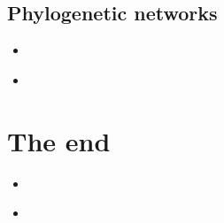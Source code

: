 \documentclass[compress, ucs, xelatex, 11pt, xcolor=x11names, aspectratio=1609,
	hyperref={
		bookmarks=true,
		unicode=true,
		colorlinks=true,
		pdftitle={HybSeq course},
		plainpages=false,
		pdfauthor={Vojtech Zeisek},
		pdfsubject={Practical processing of HybSeq target enrichment sequencing data on computing grids like MetaCentrum},
		pdfcreator={XeLaTeX},
		pdfkeywords={BASH, command line, GNU, HybSeq, Linux, MetaCentrum, sequencing shell, target enrichment},
		linkcolor=Cyan2, %
		anchorcolor=Firebrick2, %
		citecolor=Firebrick2, %
		filecolor=Firebrick2, %
		menucolor=Firebrick2, %
		urlcolor=Chartreuse2, %
		pdftex},
	url={hyphens, lowtilde} %
	]{beamer}
\begin{document}
\subsection{Phylogenetic networks}

\begin{frame}[fragile]{}
	\begin{itemize}
		\item 
	\end{itemize}
	\begin{spluscode}
    
	\end{spluscode}
	\begin{bashcode}
    
	\end{bashcode}
\end{frame}

\begin{frame}[fragile]{}
	\begin{itemize}
		\item 
	\end{itemize}
	\begin{spluscode}
    
	\end{spluscode}
	\begin{bashcode}
    
	\end{bashcode}
\end{frame}

\section{The end}

\begin{frame}[fragile]{}
	\begin{itemize}
		\item 
	\end{itemize}
	\begin{spluscode}
    
	\end{spluscode}
	\begin{bashcode}
    
	\end{bashcode}
\end{frame}

\begin{frame}[fragile]{}
	\begin{itemize}
		\item 
	\end{itemize}
	\begin{spluscode}
    
	\end{spluscode}
	\begin{bashcode}
    
	\end{bashcode}
\end{frame}
\end{document}
